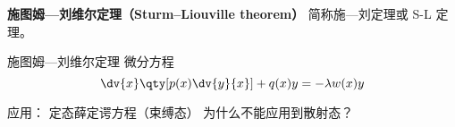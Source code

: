 
\begin{issues}
\issueDraft
\end{issues}

\textbf{施图姆—刘维尔定理（Sturm–Liouville theorem）} 简称施—刘定理或 S-L 定理。

\begin{theorem}{施图姆—刘维尔定理}
微分方程
\begin{equation}
\dv{x}\qty[p(x)\dv{y}{x}] + q(x) y = -\lambda w(x) y
\end{equation}
\end{theorem}

应用： 定态薛定谔方程（束缚态） 为什么不能应用到散射态？

